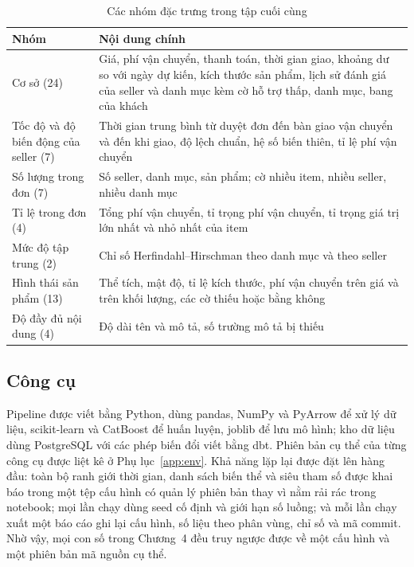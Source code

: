 \begin{table}[htbp]\centering\small
\caption{Các nhóm đặc trưng trong tập cuối cùng}\label{tab:features}
\begin{tabular}{p{4.2cm}p{9cm}}
\toprule
Nhóm & Nội dung chính \\
\midrule
Cơ sở (24) & Giá, phí vận chuyển, thanh toán, thời gian giao, khoảng dư so với ngày dự kiến, kích thước sản phẩm, lịch sử đánh giá của seller và danh mục kèm cờ hỗ trợ thấp, danh mục, bang của khách \\
Tốc độ và độ biến động của seller (7) & Thời gian trung bình từ duyệt đơn đến bàn giao vận chuyển và đến khi giao, độ lệch chuẩn, hệ số biến thiên, tỉ lệ phí vận chuyển \\
Số lượng trong đơn (7) & Số seller, danh mục, sản phẩm; cờ nhiều item, nhiều seller, nhiều danh mục \\
Tỉ lệ trong đơn (4) & Tổng phí vận chuyển, tỉ trọng phí vận chuyển, tỉ trọng giá trị lớn nhất và nhỏ nhất của item \\
Mức độ tập trung (2) & Chỉ số Herfindahl--Hirschman theo danh mục và theo seller \\
Hình thái sản phẩm (13) & Thể tích, mật độ, tỉ lệ kích thước, phí vận chuyển trên giá và trên khối lượng, các cờ thiếu hoặc bằng không \\
Độ đầy đủ nội dung (4) & Độ dài tên và mô tả, số trường mô tả bị thiếu \\
\bottomrule
\end{tabular}
\end{table}

\subsection{Công cụ}

Pipeline được viết bằng Python, dùng pandas, NumPy và PyArrow để xử lý dữ liệu, scikit-learn và CatBoost để huấn luyện, joblib để lưu mô hình; kho dữ liệu dùng PostgreSQL với các phép biến đổi viết bằng dbt. Phiên bản cụ thể của từng công cụ được liệt kê ở Phụ lục~\ref{app:env}. Khả năng lặp lại được đặt lên hàng đầu: toàn bộ ranh giới thời gian, danh sách biến thể và siêu tham số được khai báo trong một tệp cấu hình có quản lý phiên bản thay vì nằm rải rác trong notebook; mọi lần chạy dùng seed cố định và giới hạn số luồng; và mỗi lần chạy xuất một báo cáo ghi lại cấu hình, số liệu theo phân vùng, chỉ số và mã commit. Nhờ vậy, mọi con số trong Chương~4 đều truy ngược được về một cấu hình và một phiên bản mã nguồn cụ thể.

